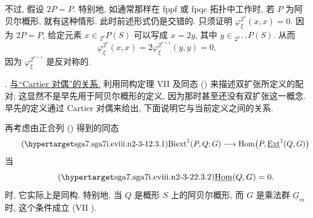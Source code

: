 不过, 假设 $2P=P$. 特别地, 如通常那样在 fppf 或 fpqc 拓扑中工作时, 若 $P$ 为阿贝尔概形, 就有这种情形. 此时前述形式仍是交错的. 只须证明 $\varphi^{2^\nu}_\xi(x,x)=0$. 因为 $2P=P$, 给定元素 $x\in{}_{2^\nu}P(S)$ 可以写成 $x=2y$, 其中 $y\in{}_{2^{\nu+1}}P(S)$. 从而
\[
 \varphi^{2^\nu}_\xi(x,x)
 =2\varphi^{2^{\nu+1}}_\xi(y,y)=0,
\]
因为 $\varphi^{2^{\nu+1}}_\xi$ 是反对称的.



. \underline{与“Cartier 对偶”的关系.}
 利用同构定理 VII  及同态 () 来描述双扩张所定义的配对; 这显然不是早先用于阿贝尔概形的定义, 因为那时甚至还没有双扩张这一概念. 早先的定义通过 Cartier 对偶来给出, 下面说明它与当前定义之间的关系.

再考虑由正合列 () 得到的同态
\begin{equation}\tag{\SGARefTarget{sga7.sga7i.eviii.n2-3-1}{2.3.1}}
 \mathrm{Biext}^1(P,Q;G)
 \longrightarrow
 \operatorname{Hom}\bigl(P,\uExt^1(Q,G)\bigr)
\end{equation}
当
\begin{equation}\tag{\SGARefTarget{sga7.sga7i.eviii.n2-3-2}{2.3.2}}
 \uHom(Q,G)=0.
\end{equation}
时, 它实际上是同构. 特别地, 当 $Q$ 是概形 $S$ 上的阿贝尔概形, 而 $G$ 是乘法群 $\underline G_m$ 时, 这个条件成立 (VII ).

